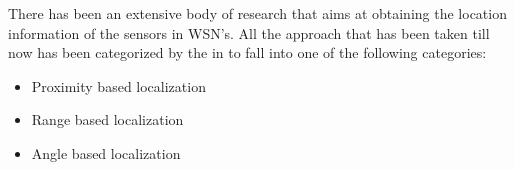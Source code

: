 
There has been an extensive body of research that aims at obtaining the location information of the sensors in WSN's. All the approach that has been taken till now has been categorized by the \citeauthor{wang2010survey} in \cite{wang2010survey} to fall into one of the following categories:
\begin{itemize}
\item Proximity based localization
\item Range based localization
\item Angle based localization
\end{itemize}

